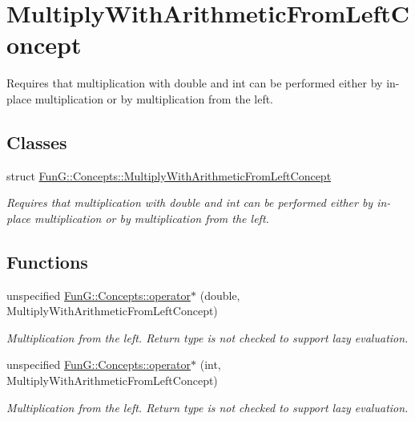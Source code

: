 \hypertarget{group__MultiplyWithArithmeticFromLeftConcept}{}\section{Multiply\+With\+Arithmetic\+From\+Left\+Concept}
\label{group__MultiplyWithArithmeticFromLeftConcept}


Requires that multiplication with double and int can be performed either by in-\/place multiplication or by multiplication from the left.  


\subsection*{Classes}
\begin{DoxyCompactItemize}
\item 
struct \hyperlink{structFunG_1_1Concepts_1_1MultiplyWithArithmeticFromLeftConcept}{Fun\+G\+::\+Concepts\+::\+Multiply\+With\+Arithmetic\+From\+Left\+Concept}
\begin{DoxyCompactList}\small\item\em Requires that multiplication with double and int can be performed either by in-\/place multiplication or by multiplication from the left. \end{DoxyCompactList}\end{DoxyCompactItemize}
\subsection*{Functions}
\begin{DoxyCompactItemize}
\item 
unspecified \hyperlink{group__MultiplyWithArithmeticFromLeftConcept_ga10d0693d96a9ea69e9de1d10b0e4da1f}{Fun\+G\+::\+Concepts\+::operator$\ast$} (double, Multiply\+With\+Arithmetic\+From\+Left\+Concept)
\begin{DoxyCompactList}\small\item\em Multiplication from the left. Return type is not checked to support lazy evaluation. \end{DoxyCompactList}\item 
unspecified \hyperlink{group__MultiplyWithArithmeticFromLeftConcept_ga593fb8c43bd98b8eae6459f77874c7c7}{Fun\+G\+::\+Concepts\+::operator$\ast$} (int, Multiply\+With\+Arithmetic\+From\+Left\+Concept)
\begin{DoxyCompactList}\small\item\em Multiplication from the left. Return type is not checked to support lazy evaluation. \end{DoxyCompactList}\end{DoxyCompactItemize}


